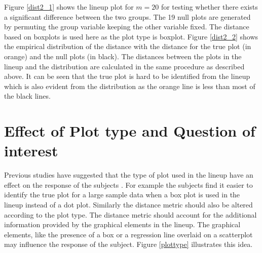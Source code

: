 \documentclass[12]{article}
\begin{document}
Figure \ref{dist2_1} shows the lineup plot for $m = 20$ for testing whether there exists a significant difference between the two groups. The 19 null plots are generated by permuting the group variable keeping the other variable fixed. The distance based on boxplots  is used here as the plot type is boxplot. Figure \ref{dist2_2} shows the empirical distribution of the distance with the distance for the true plot (in orange) and the null plots (in black). The distances between the plots in the lineup and the distribution are calculated in the same procedure as described above. It can be seen that the true plot is hard to be identified from the lineup which is also evident from the distribution as the orange line is less than most of the black lines.

\section{Effect of Plot type and Question of interest }

Previous studies have suggested that the type of plot used in the lineup have an effect on the response of the subjects \citep{zhao:2012}. For example the subjects find it easier to identify the true plot for a large sample data when a box plot is used in the lineup instead of a dot plot. Similarly the distance metric should also be altered according to the plot type. The distance metric should account for the additional information provided by the graphical elements in the lineup. The graphical elements, like the presence of a box or a regression line overlaid on a scatterplot may influence the response of the subject. Figure \ref{plottype} illustrates this idea. 
\end{document}
